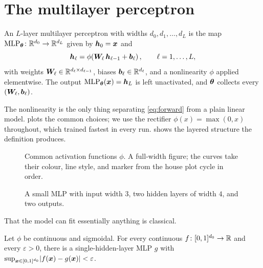 \section{The multilayer perceptron}
\label{sec:model}

\begin{definition}
  \label{def:mlp}
  An $L$-layer multilayer perceptron with widths $d_0, d_1, \dots, d_L$ is the
  map $\mathrm{MLP}_{{\bm{\theta}}} \colon \mathbb{R}^{d_0} \to \mathbb{R}^{d_L}$ given by
  ${\bm{h}}_0 = {\bm{x}}$ and
  \begin{equation}
    \label{eq:forward}
    {\bm{h}}_\ell = \phi\!\left({\bm{W}}_\ell\, {\bm{h}}_{\ell-1} + {\bm{b}}_\ell\right),
    \qquad \ell = 1, \dots, L,
  \end{equation}
  with weights ${\bm{W}}_\ell \in \mathbb{R}^{d_\ell \times d_{\ell-1}}$, biases
  ${\bm{b}}_\ell \in \mathbb{R}^{d_\ell}$, and a nonlinearity $\phi$ applied elementwise. The
  output $\mathrm{MLP}_{{\bm{\theta}}}({\bm{x}}) = {\bm{h}}_L$ is left unactivated, and ${\bm{\theta}}$
  collects every $({\bm{W}}_\ell, {\bm{b}}_\ell)$.
\end{definition}

The nonlinearity is the only thing separating \cref{eq:forward} from a plain
linear model.
 plots the common choices; we use the rectifier
$\phi(x) = \max(0, x)$ throughout, which trained fastest in every run.
 shows the layered structure the definition produces.

\begin{figure}[t]
  \centering
  
  \caption{Common activation functions $\phi$. A full-width figure; the curves
    take their colour, line style, and marker from the house plot cycle in
    order.}
  \label{fig:activations}
\end{figure}

\begin{figure}[t]
  \centering
  
  \caption{A small MLP with input width $3$, two hidden layers of width $4$, and
    two outputs.}
  \label{fig:arch}
\end{figure}

That the model can fit essentially anything is classical.

\begin{theorem}
  \label{thm:ua}
  Let $\phi$ be continuous and sigmoidal. For every continuous
  $f \colon [0,1]^{d_0} \to \mathbb{R}$ and every $\varepsilon > 0$, there is a
  single-hidden-layer MLP $g$ with
  $\sup_{{\bm{x}} \in [0,1]^{d_0}} \lvert f({\bm{x}}) - g({\bm{x}})\rvert < \varepsilon$.
\end{theorem}

